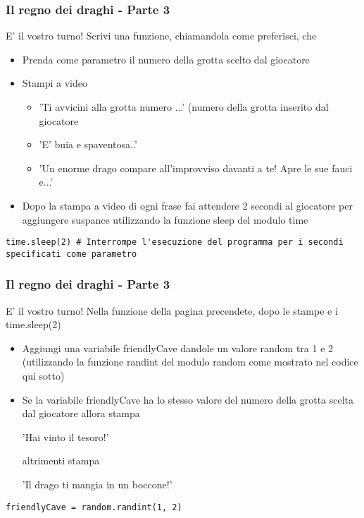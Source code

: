 \begin{frame}[fragile]
\frametitle{Il regno dei draghi - Parte 3}

\begin{block}{E' il vostro turno!}
Scrivi una funzione, chiamandola come preferisci, che
    \begin{itemize}
        \item Prenda come parametro il numero della grotta scelto dal giocatore
        \item Stampi a video
            \begin{itemize}
                \item 'Ti avvicini alla grotta numero ...' (numero della grotta inserito dal giocatore 
                \item 'E' buia e spaventosa..'
                \item 'Un enorme drago compare all'improvviso davanti a te! Apre le sue fauci e...'
            \end{itemize}
        \item Dopo la stampa a video di ogni frase fai attendere 2 secondi al giocatore per aggiungere suspance utilizzando la funzione sleep del modulo time
    \end{itemize}
\end{block}

    \begin{lstlisting}
time.sleep(2) # Interrompe l'esecuzione del programma per i secondi specificati come parametro
    \end{lstlisting}
\end{frame}

\begin{frame}[fragile]
\frametitle{Il regno dei draghi - Parte 3}

\begin{block}{E' il vostro turno!}
Nella funzione della pagina precendete, dopo le stampe e i time.sleep(2)
    \begin{itemize}
        \item Aggiungi una variabile friendlyCave dandole un valore random tra 1 e 2 (utilizzando la funzione randint del modulo random come mostrato nel codice qui sotto)
        \item Se la variabile friendlyCave ha lo stesso valore del numero della grotta scelta dal giocatore allora stampa
        
        'Hai vinto il tesoro!'
        
        altrimenti stampa
        
        'Il drago ti mangia in un boccone!'
    \end{itemize}
\end{block}

    \begin{lstlisting}
friendlyCave = random.randint(1, 2)
    \end{lstlisting}
\end{frame}

